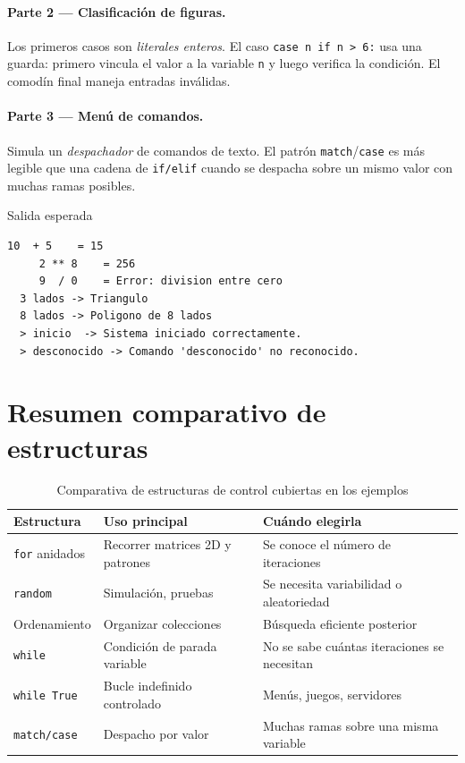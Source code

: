 \documentclass[12pt,a4paper]{article}
\begin{document}
\paragraph{Parte 2 — Clasificación de figuras.}
Los primeros casos son \emph{literales enteros}. El caso
\texttt{case n if n > 6:} usa una guarda: primero vincula el valor a la variable
\texttt{n} y luego verifica la condición.  El comodín final maneja entradas inválidas.

\paragraph{Parte 3 — Menú de comandos.}
Simula un \emph{despachador} de comandos de texto. El patrón \texttt{match}/\texttt{case}
es más legible que una cadena de \texttt{if/elif} cuando se despacha sobre
un mismo valor con muchas ramas posibles.

\vspace{0.6em}
\begin{salidabox}{Salida esperada}
\begin{lstlisting}[style=OutputStyle]
    10  + 5    = 15
     2 ** 8    = 256
     9  / 0    = Error: division entre cero
  3 lados -> Triangulo
  8 lados -> Poligono de 8 lados
  > inicio  -> Sistema iniciado correctamente.
  > desconocido -> Comando 'desconocido' no reconocido.
\end{lstlisting}
\end{salidabox}

\newpage
\section*{Resumen comparativo de estructuras}

\begin{table}[h!]
\centering
\renewcommand{\arraystretch}{1.5}
\begin{tabular}{|p{3.2cm}|p{4.2cm}|p{5.8cm}|}
\hline
\rowcolor{anaDark!15}
\textbf{Estructura} & \textbf{Uso principal} & \textbf{Cuándo elegirla} \\
\hline
\texttt{for} anidados & Recorrer matrices 2D y patrones & Se conoce el número de iteraciones \\
\hline
\texttt{random} & Simulación, pruebas & Se necesita variabilidad o aleatoriedad \\
\hline
Ordenamiento & Organizar colecciones & Búsqueda eficiente posterior \\
\hline
\texttt{while} & Condición de parada variable & No se sabe cuántas iteraciones se necesitan \\
\hline
\texttt{while True} & Bucle indefinido controlado & Menús, juegos, servidores \\
\hline
\texttt{match/case} & Despacho por valor & Muchas ramas sobre una misma variable \\
\hline
\end{tabular}
\caption{Comparativa de estructuras de control cubiertas en los ejemplos}
\end{table}
\end{document}
